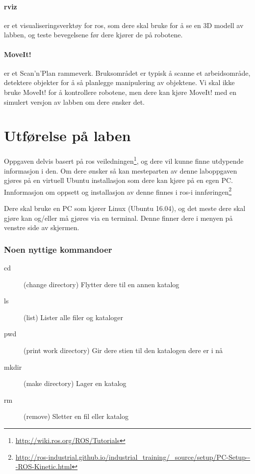 \documentclass{article}
\begin{document}
\paragraph{rviz} er et visualiseringsverktøy for \gls{ros}, som dere skal bruke for å se en 3D modell av labben, og teste bevegelsene før dere kjører de på robotene.

\paragraph{MoveIt!} er et Scan'n'Plan rammeverk. Bruksområdet er typisk å scanne et arbeidsområde, detektere objekter for å så planlegge manipulering av objektene. Vi skal ikke bruke MoveIt! for å kontrollere robotene, men dere kan kjøre MoveIt! med en simulert versjon av labben om dere ønsker det. 


\clearpage
\section{Utførelse på laben}
Oppgaven delvis basert på \gls{ros} veiledningen\footnote{\url{http://wiki.ros.org/ROS/Tutorials}}, og dere vil kunne finne utdypende informasjon i den. Om dere ønsker så kan mesteparten av denne laboppgaven gjøres på en virtuell Ubuntu installasjon som dere kan kjøre på en egen PC. Innformasjon om oppsett og installasjon av denne finnes i \gls{ros-i} innføringen\footnote{\url{http://ros-industrial.github.io/industrial_training/_source/setup/PC-Setup---ROS-Kinetic.html}} 

Dere skal bruke en PC som kjører Linux (Ubuntu 16.04), og det meste dere skal gjøre kan og/eller må gjøres via en terminal. Denne finner dere i menyen på venstre side av skjermen. 
\subsubsection*{Noen nyttige kommandoer}
\begin{description}
\item[cd] (change directory) Flytter dere til en annen katalog
\item[ls] (list) Lister alle filer og kataloger
\item[pwd] (print work directory) Gir dere stien til den katalogen dere er i nå
\item[mkdir] (make directory) Lager en katalog
\item[rm] (remove) Sletter en fil eller katalog
\end{description}
\end{document}
